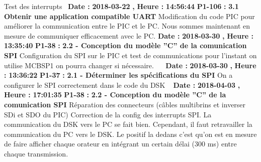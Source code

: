 \documentclass{article}%
\begin{document}
%
Test des interrupts~\newline%
\newline%
%
\textbf{Date : }%
\textbf{2018{-}03{-}22}%
\textbf{,}%
\textbf{ Heure : }%
\textbf{14:56:44}%
\newline%
%
\textbf{P1{-}106 }%
\textbf{ : }%
\textbf{ 3.1 Obtenir une application compatible UART}%
\newline%
\newline%
%
Modification du code PIC pour améliorer la communication entre le PIC et le PC. Nous sommes maintenant en mesure de communiquer efficacement avec le PC.\newline%
\newline%
%
\textbf{Date : }%
\textbf{2018{-}03{-}30}%
\textbf{,}%
\textbf{ Heure : }%
\textbf{13:35:40}%
\newline%
%
\textbf{P1{-}38 }%
\textbf{ : }%
\textbf{ 2.2 {-} Conception du modèle ''C'' de la comunication SPI}%
\newline%
\newline%
%
Configuration du SPI sur le PIC et test de communications pour l'instant on utilise MCBSP1 on pourra changer si nécessaire.~\newline%
~\newline%
\newline%
%
\textbf{Date : }%
\textbf{2018{-}03{-}30}%
\textbf{,}%
\textbf{ Heure : }%
\textbf{13:36:22}%
\newline%
%
\textbf{P1{-}37 }%
\textbf{ : }%
\textbf{ 2.1 {-} Déterminer les spécifications du SPI}%
\newline%
\newline%
%
On a configurer le SPI correctement dans le code du DSK\newline%
~\newline%
\newline%
%
\textbf{Date : }%
\textbf{2018{-}04{-}03}%
\textbf{,}%
\textbf{ Heure : }%
\textbf{17:01:35}%
\newline%
%
\textbf{P1{-}38 }%
\textbf{ : }%
\textbf{ 2.2 {-} Conception du modèle ''C'' de la comunication SPI}%
\newline%
\newline%
%
Réparation des connecteurs (câbles multibrins et inverser SDi et SDO du PIC)\newline%
Correction de la config des interrupts SPI. La communication du DSK vers le PC se fait bien. Cependant, il faut retravailler la communication du PC vers le DSK. Le positif la dedans c'est qu'on est en mesure de faire afficher chaque orateur en intégrant un certain délai (300 ms) entre chaque transmission.~\newline%
\end{document}
